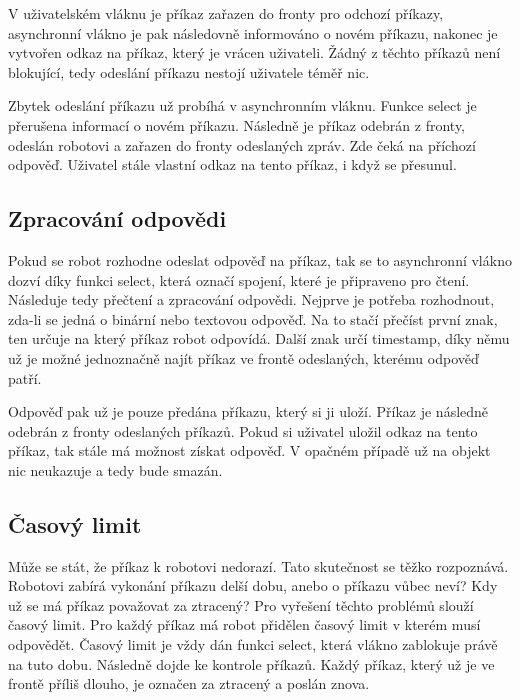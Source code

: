 \documentclass[12pt,notitlepage]{report}
\begin{document}
    V uživatelském vláknu je příkaz zařazen do fronty pro odchozí příkazy,
    asynchronní vlákno je pak následovně informováno o novém příkazu, nakonec
    je vytvořen odkaz na příkaz, který je vrácen uživateli. Žádný z těchto
    příkazů není blokující, tedy odeslání příkazu nestojí uživatele téměř nic.

    Zbytek odeslání příkazu už probíhá v asynchronním vláknu. Funkce select je
    přerušena informací o novém příkazu. Následně je příkaz odebrán z fronty,
    odeslán robotovi a zařazen do fronty odeslaných zpráv. Zde čeká na příchozí
    odpověď. Uživatel stále vlastní odkaz na tento příkaz, i když se přesunul.

    \subsection{Zpracování odpovědi}

    Pokud se robot rozhodne odeslat odpověď na příkaz, tak se to asynchronní
    vlákno dozví díky funkci select, která označí spojení, které je připraveno
    pro čtení. Následuje tedy přečtení a zpracování odpovědi. Nejprve je
    potřeba rozhodnout, zda-li se jedná o binární nebo textovou odpověď. Na to
    stačí přečíst první znak, ten určuje na který příkaz robot odpovídá. Další
    znak určí timestamp, díky němu už je možné jednoznačně najít příkaz ve
    frontě odeslaných, kterému odpověď patří.

    Odpověď pak už je pouze předána příkazu, který si ji uloží. Příkaz je
    následně odebrán z fronty odeslaných příkazů. Pokud si uživatel uložil
    odkaz na tento příkaz, tak stále má možnost získat odpověď. V opačném
    případě už na objekt nic neukazuje a tedy bude smazán.

    \subsection{Časový limit}

    Může se stát, že příkaz k robotovi nedorazí. Tato skutečnost se těžko
    rozpoznává. Robotovi zabírá vykonání příkazu delší dobu, anebo o příkazu
    vůbec neví? Kdy už se má příkaz považovat za ztracený? Pro vyřešení těchto
    problémů slouží časový limit. Pro každý příkaz má robot přidělen časový
    limit v kterém musí odpovědět. Časový limit je vždy dán funkci select,
    která vlákno zablokuje právě na tuto dobu. Následně dojde ke kontrole
    příkazů. Každý příkaz, který už je ve frontě příliš dlouho, je označen za
    ztracený a poslán znova.
\end{document}
